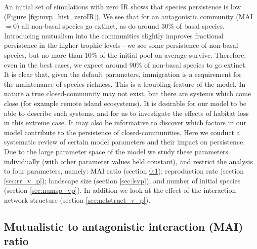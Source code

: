 An initial set of simulations with zero IR shows that species persistence is low (Figure \ref{fig:mvp_hist_zeroIR}). We see that for an antagonistic community (MAI$=0$) all non-basal species go extinct, as do around $30\%$ of basal species. Introducing mutualism into the communities slightly improves fractional persistence in the higher trophic levels - we see some persistence of non-basal species, but no more than $10\%$ of the initial pool on average survive. Therefore, even in the best cases, we expect around $90\%$ of non-basal species to go extinct. It is clear that, given the default parameters, immigration is a requirement for the maintenance of species richness. This is a troubling feature of the model. In nature a true closed-community may not exist, but there are systems which come close (for example remote island ecosystems). It is desirable for our model to be able to describe such systems, and for us to investigate the effects of habitat loss in this extreme case.  It may also be informative to discover which factors in our model contribute to the persistence of closed-communities. Here we conduct a systematic review of certain model parameters and their impact on persistence. Due to the large parameter space of the model we study these parameters individually (with other parameter values held constant), and restrict the analysis to four parameters, namely: MAI ratio (section \ref{sec:mvp}); reproduction rate (section \ref{sec:rr_v_p}); landscape size (section \ref{sec:lsvp}); and number of initial species (section \ref{sec:numsp_vp}). In addition we look at the effect of the interaction network structure (section \ref{sec:netstruct_v_p}).



\subsection{Mutualistic to antagonistic interaction (MAI) ratio}
\label{sec:mvp}

